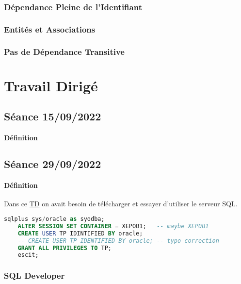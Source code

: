 \documentclass{article}
\begin{document}
\subsubsection{Dépendance Pleine de l'Identifiant}
\subsubsection{Entités et Associations}
\subsubsection{Pas de Dépendance Transitive}

\section{Travail Dirigé}
\subsection{Séance 15/09/2022}
\paragraph{Définition}

\subsection{Séance 29/09/2022}
\paragraph{Définition}Dans ce \href{http://www-smis.inria.fr/~anciaux/ENSTA/IN206/6-VM/}{TD} on avait besoin de télécharger et essayer d'utiliser le serveur SQL.
\begin{scriptsize}\mycode
    \begin{lstlisting}[language=SQL]
    sqlplus sys/oracle as syodba;
    ALTER SESSION SET CONTAINER = XEPOB1;   -- maybe XEP0B1
    CREATE USER TP IDINTIFIED BY oracle;
    -- CREATE USER TP IDENTIFIED BY oracle; -- typo correction
    GRANT ALL PRIVILEGES TO TP;
    escit;
    \end{lstlisting}
\end{scriptsize}
\subsubsection{SQL Developer}
\end{document}
